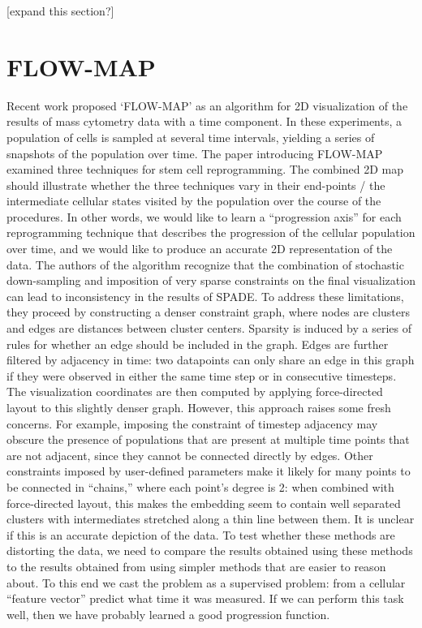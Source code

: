 \documentclass{article}
\begin{document}
[expand this section?]


\section{FLOW-MAP}
Recent work proposed ‘FLOW-MAP’ as an algorithm for 2D visualization of the results of mass cytometry data with a time component. In these experiments, a population of cells is sampled at several time intervals, yielding a series of snapshots of the population over time. The paper introducing FLOW-MAP examined three techniques for stem cell reprogramming. The combined 2D map should illustrate whether the three techniques vary in their end-points / the intermediate cellular states visited by the population over the course of the procedures. In other words, we would like to learn a “progression axis” for each reprogramming technique that describes the progression of the cellular population over time, and we would like to produce an accurate 2D representation of the data.
The authors of the algorithm recognize that the combination of stochastic down-sampling and imposition of very sparse constraints on the final visualization can lead to inconsistency in the results of SPADE. To address these limitations, they proceed by constructing a denser constraint graph, where nodes are clusters and edges are distances between cluster centers. Sparsity is induced by a series of rules for whether an edge should be included in the graph. Edges are further filtered by adjacency in time: two datapoints can only share an edge in this graph if they were observed in either the same time step or in consecutive timesteps. The visualization coordinates are then computed by applying force-directed layout to this slightly denser graph.
However, this approach raises some fresh concerns. For example, imposing the constraint of timestep adjacency may obscure the presence of populations that are present at multiple time points that are not adjacent, since they cannot be connected directly by edges. Other constraints imposed by user-defined parameters make it likely for many points to be connected in “chains,” where each point’s degree is 2: when combined with force-directed layout, this makes the embedding seem to contain well separated clusters with intermediates stretched along a thin line between them. It is unclear if this is an accurate depiction of the data.
To test whether these methods are distorting the data, we need to compare the results obtained using these methods to the results obtained from using simpler methods that are easier to reason about. To this end we cast the problem as a supervised problem: from a cellular “feature vector” predict what time it was measured. If we can perform this task well, then we have probably learned a good progression function.




\end{document}
